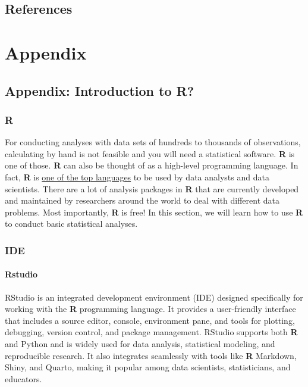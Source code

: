 \documentclass[
  letterpaper,
  DIV=11,
  numbers=noendperiod]{scrreprt}
\begin{document}

\chapter*{References}\label{references}


\label{refs}

\part{Appendix}

\chapter{Appendix: Introduction to R?}\label{appendix-introduction-to-r}

\section{R}\label{r}

For conducting analyses with data sets of hundreds to thousands of
observations, calculating by hand is not feasible and you will need a
statistical software. \textbf{R} is one of those. \textbf{R} can also be
thought of as a high-level programming language. In fact, \textbf{R} is
\href{https://statisticstimes.com/tech/top-computer-languages.php}{one
of the top languages} to be used by data analysts and data scientists.
There are a lot of analysis packages in \textbf{R} that are currently
developed and maintained by researchers around the world to deal with
different data problems. Most importantly, \textbf{R} is free! In this
section, we will learn how to use \textbf{R} to conduct basic
statistical analyses.

\section{IDE}\label{ide}

\subsection{Rstudio}\label{rstudio}

RStudio is an integrated development environment (IDE) designed
specifically for working with the \textbf{R} programming language. It
provides a user-friendly interface that includes a source editor,
console, environment pane, and tools for plotting, debugging, version
control, and package management. RStudio supports both \textbf{R} and
Python and is widely used for data analysis, statistical modeling, and
reproducible research. It also integrates seamlessly with tools like
\textbf{R} Markdown, Shiny, and Quarto, making it popular among data
scientists, statisticians, and educators.
\end{document}
